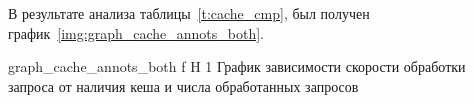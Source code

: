 В результате анализа таблицы~\ref{t:cache_cmp}, был получен график~\ref{img:graph_cache_annots_both}.

{graph_cache_annots_both} %
{f} %
{H} %
{1\textwidth} %
{График зависимости скорости обработки запроса от наличия кеша и числа обработанных запросов} %







